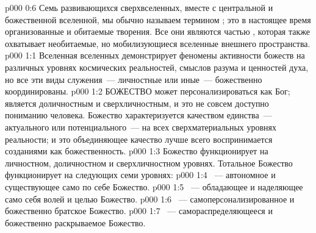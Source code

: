 \vs p000 0:6 Семь развивающихся сверхвселенных, вместе с центральной и божественной вселенной, мы обычно называем термином ; это в настоящее время организованные и обитаемые творения. Все они являются частью , которая также охватывает необитаемые, но мобилизующиеся вселенные внешнего пространства.
\vs p000 1:1 Вселенная вселенных демонстрирует феномены активности божеств на различных уровнях космических реальностей, смыслов разума и ценностей духа, но все эти виды служения~--- личностные или иные~--- божественно координированы.
\vs p000 1:2 \pc БОЖЕСТВО может персонализироваться как Бог; является доличностным и сверхличностным, и это не совсем доступно пониманию человека. Божество характеризуется качеством единства~--- актуального или потенциального~--- на всех сверхматериальных уровнях реальности; и это объединяющее качество лучше всего воспринимается созданиями как божественность.
\vs p000 1:3 \pc Божество функционирует на личностном, доличностном и сверхличностном уровнях. Тотальное Божество функционирует на следующих семи уровнях:
\vs p000 1:4 ~--- автономное и существующее само по себе Божество.
\vs p000 1:5 ~--- обладающее и наделяющее само себя волей и целью Божество.
\vs p000 1:6 ~--- самоперсонализированное и божественно братское Божество.
\vs p000 1:7 ~--- самораспределяющееся и божественно раскрываемое Божество.
